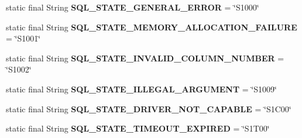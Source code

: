 \begin{DoxyCompactItemize}
\item 
\mbox{\label{classcom_1_1mysql_1_1cj_1_1exceptions_1_1_mysql_error_numbers_aa17a8d39299fed2b1f47079dfa16ac77}} 
static final String {\bfseries S\+Q\+L\+\_\+\+S\+T\+A\+T\+E\+\_\+\+G\+E\+N\+E\+R\+A\+L\+\_\+\+E\+R\+R\+OR} = \char`\"{}S1000\char`\"{}
\item 
\mbox{\label{classcom_1_1mysql_1_1cj_1_1exceptions_1_1_mysql_error_numbers_a7596452cbd55217f01f5c56231f3531d}} 
static final String {\bfseries S\+Q\+L\+\_\+\+S\+T\+A\+T\+E\+\_\+\+M\+E\+M\+O\+R\+Y\+\_\+\+A\+L\+L\+O\+C\+A\+T\+I\+O\+N\+\_\+\+F\+A\+I\+L\+U\+RE} = \char`\"{}S1001\char`\"{}
\item 
\mbox{\label{classcom_1_1mysql_1_1cj_1_1exceptions_1_1_mysql_error_numbers_a41e290b0d295e5a7aa105117d15ce48b}} 
static final String {\bfseries S\+Q\+L\+\_\+\+S\+T\+A\+T\+E\+\_\+\+I\+N\+V\+A\+L\+I\+D\+\_\+\+C\+O\+L\+U\+M\+N\+\_\+\+N\+U\+M\+B\+ER} = \char`\"{}S1002\char`\"{}
\item 
\mbox{\label{classcom_1_1mysql_1_1cj_1_1exceptions_1_1_mysql_error_numbers_a700b34460f8efdee0400f36593444aec}} 
static final String {\bfseries S\+Q\+L\+\_\+\+S\+T\+A\+T\+E\+\_\+\+I\+L\+L\+E\+G\+A\+L\+\_\+\+A\+R\+G\+U\+M\+E\+NT} = \char`\"{}S1009\char`\"{}
\item 
\mbox{\label{classcom_1_1mysql_1_1cj_1_1exceptions_1_1_mysql_error_numbers_afd2ce2d3cd8e930eea4162f430d740d5}} 
static final String {\bfseries S\+Q\+L\+\_\+\+S\+T\+A\+T\+E\+\_\+\+D\+R\+I\+V\+E\+R\+\_\+\+N\+O\+T\+\_\+\+C\+A\+P\+A\+B\+LE} = \char`\"{}S1\+C00\char`\"{}
\item 
\mbox{\label{classcom_1_1mysql_1_1cj_1_1exceptions_1_1_mysql_error_numbers_a3349791fb4a3690035a7a7fe91449e39}} 
static final String {\bfseries S\+Q\+L\+\_\+\+S\+T\+A\+T\+E\+\_\+\+T\+I\+M\+E\+O\+U\+T\+\_\+\+E\+X\+P\+I\+R\+ED} = \char`\"{}S1\+T00\char`\"{}
\item 
\mbox{\label{classcom_1_1mysql_1_1cj_1_1exceptions_1_1_mysql_error_numbers_a6138016f801da5c4a3c1082df0cc46c6}} 

\end{DoxyCompactItemize}
